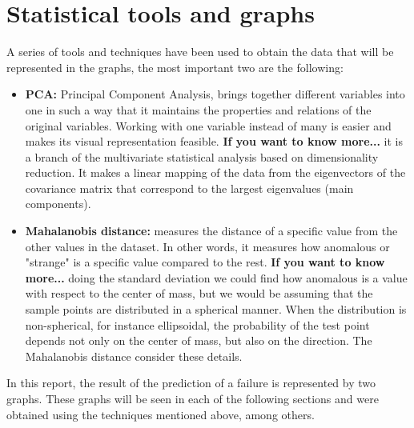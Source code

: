 \documentclass[11pt,twoside]{article}
\begin{document}
\section{Statistical tools and graphs}
A series of tools and techniques have been used to obtain the data that will be represented in
the graphs, the most important two are the following:
\begin{itemize}
     \item \textbf{PCA:} Principal Component Analysis, brings together different variables into
     one in such a way that it maintains the properties and relations of the original variables.
     Working with one variable instead of many is easier and makes its visual representation
     feasible. \textbf{If you want to know more...} it is a branch of the multivariate statistical
     analysis based on dimensionality reduction. It makes a linear mapping of the data from the 
     eigenvectors of the covariance matrix that correspond to the largest eigenvalues (main 
     components).

     \item \textbf{Mahalanobis distance:} measures the distance of a specific value from the other
     values in the dataset. In other words, it measures how anomalous or "strange" is a specific value
     compared to the rest. \textbf{If you want to know more...} doing the standard deviation we could
     find how anomalous is a value with respect to the center of mass, but we would be assuming that
     the sample points are distributed in a spherical manner. When the distribution is non-spherical,
     for instance ellipsoidal, the probability of the test point depends not only on the center of mass,
     but also on the direction. The Mahalanobis distance consider these details.
\end{itemize}

\noindent In this report, the result of the prediction of a failure is represented by two graphs. These graphs will
be seen in each of the following sections and were obtained using the techniques mentioned above, among
others.
\newpage
\end{document}
